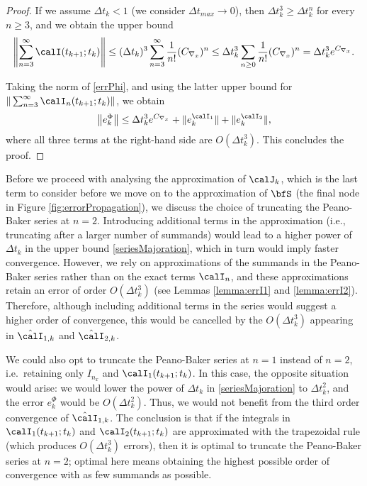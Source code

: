 \documentclass[DIV=12]{scrartcl} %
\newcommand{\err}{\ensuremath{e}}
\theoremstyle{definition}
\begin{document}
\begin{proof}
If we assume $\Delta t_k<1$ (we consider $\Delta t_{max}\to 0$), then $\Delta t_k^3\ge \Delta t_k^n$ for every $n\ge 3$, and we obtain the upper bound
 \begin{equation}
     \label{seriesMajoration}
     \left\|  \sum_{n=3}^\infty\calI(t_{k+1};t_k)\right\|\le (\Delta t_k)^3\sum_{n=3}^\infty\frac{1}{n!} (C_{\nabla_x})^n\le \Delta t_k^3\sum_{n\ge 0}\frac{1}{n!} (C_{\nabla_x})^n=\Delta t_k^3 e^{C_{\nabla_x}}.
 \end{equation}

Taking the norm of \eqref{errPhi}, and using the latter upper bound for $\| \sum_{n=3}^\infty\calI_n(t_{k+1};t_k) \|$,  we obtain
\[
\left\|\err^{\Phi}_k\right\|\le \Delta t_k^3 e^{C_{\nabla_x}}+\|\err_k^{\calI_1}\|+\|\err_k^{\calI_2}\|,
\]
where all three terms at the right-hand side are $O(\Delta t_k^3)$. This concludes the proof.
\end{proof}

Before we proceed with analysing the approximation of $\calJ _k$, which is the last term to consider before we move on to the approximation of $\bfS$ (the final node in Figure \ref{fig:errorPropagation}), we discuss the choice of truncating the Peano-Baker series at $n=2$. Introducing additional terms in the approximation (i.e., truncating after a larger number of summands) would lead to a higher power of $\Delta t_k$ in the upper bound \eqref{seriesMajoration}, which in turn would imply faster convergence. However, we rely on approximations of the summands in the Peano-Baker series rather than on the exact terms $\calI_n$, and these approximations retain an error of order $O(\Delta t_k^3)$ (see Lemmas \ref{lemma:errI1} and \ref{lemma:errI2}). Therefore, although including additional terms in the series would suggest a higher order of convergence, this would be cancelled by the $O(\Delta t_k^3)$ appearing in $\hat{\calI}_{1,k}$ and $\hat{\calI}_{2,k}$. 

We could also opt to truncate the Peano-Baker series at $n=1$ instead of $n=2$, i.e.\ retaining only $I_{n_x}$ and $\calI_{1}(t_{k+1};t_k)$. In this case, the opposite situation would arise: we would lower the power of $\Delta t_k$ in \eqref{seriesMajoration} to $\Delta t_k^2$, and the error $\err_k^{\Phi}$ would be $O(\Delta t_k^2)$. Thus, we would not benefit from the third order convergence of $\hat{\calI}_{1,k}$. The conclusion is that if the integrals in $\calI_1(t_{k+1};t_k)$ and $\calI_2(t_{k+1};t_k)$ are approximated with the trapezoidal rule (which produces $O(\Delta t_k^3)$ errors), then it is optimal to truncate the Peano-Baker series at $n=2$; optimal here means obtaining the highest possible order of convergence with as few summands as possible.
\end{document}
